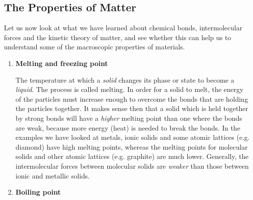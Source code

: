             \subsection{ The Properties of Matter }
            \nopagebreak
            \label{m38734*id309103}Let us now look at what we have learned about chemical 
bonds, intermolecular forces and the kinetic theory of matter, and see whether 
this can help us to understand some of the macroscopic properties of materials.
\par 
      \label{m38734*id309108}\begin{enumerate}[noitemsep, label=\textbf{\arabic*}. ] 
            \label{m38734*uid43}\item \textbf{Melting and freezing point}
\par
 { \label{m38734*meaningfhsst!!!underscore!!!id276}
The temperature at which a \textsl{solid} changes 
its phase or state to become a \textsl{liquid}. The 
process is called melting. 
 } 
In order for a solid to melt, the energy of the particles 
must increase enough to overcome the bonds that are holding the particles 
together. It makes sense then that a solid which is held together by strong 
bonds will have a \textsl{higher} melting point 
than one where the bonds are weak, because more energy (heat) is needed to break 
the bonds. In the examples we have looked at metals, ionic solids and some 
atomic lattices (e.g. diamond) have high melting points, whereas the melting 
points for molecular solids and other atomic lattices (e.g. graphite) are much 
lower. Generally, the intermolecular forces between molecular solids are 
\textsl{weaker} than those between ionic and 
metallic solids.
\label{m38734*uid44}\item \textbf{Boiling point}
\par
            \label{m38734*fhsst!!!underscore!!!id282}

\end{enumerate}
